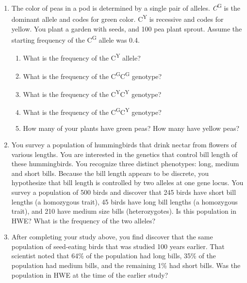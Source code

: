 \documentclass[11pt]{article}
\begin{document}
\begin{enumerate}

\item The color of peas in a pod is determined by a single pair of alleles.  \emph{C}\textsuperscript{G} is the dominant allele and codes for green color.  C\textsuperscript{Y} is recessive and codes for yellow.  You plant a garden with seeds, and 100 pea plant sprout.  Assume the starting frequency of the C\textsuperscript{G} allele was 0.4.  

	\begin{enumerate}[label=\alph*.]
		\item What is the frequency of the C\textsuperscript{Y} allele?\vspace{1cm}

		\item What is the frequency of the C\textsuperscript{G}C\textsuperscript{G} genotype?\vspace{1cm}

		\item What is the frequency of the C\textsuperscript{Y}C\textsuperscript{Y} genotype?\vspace{1cm}

		\item What is the frequency of the C\textsuperscript{G}C\textsuperscript{Y} genotype?\vspace{1cm}

		\item How many of your plants have green peas?  How many have yellow peas?\vspace{0.25cm}
	\end{enumerate}

\newpage

\item You survey a population of hummingbirds that drink nectar from flowers of various lengths.  You are interested in the genetics that control bill length of these hummingbirds. You recognize three distinct phenotypes: long, medium and short bills.  Because the bill length appears to be discrete, you hypothesize that bill length is controlled by two alleles at one gene locus. You survey a population of 500 birds and discover that 245 birds have short bill lengths (a homozygous trait), 45 birds have long bill lengths (a homozygous trait), and 210 have medium size bills (heterozygotes).  Is this population in HWE?  What is the frequency of the two alleles?\vspace{3in}

\item After completing your study above, you find discover that the same population of seed-eating birds that was studied 100 years earlier.  That scientist noted that 64\% of the population had long bills, 35\% of the population had medium bills, and the remaining 1\% had short bills.  Was the population in HWE at the time of the earlier study?  


\end{enumerate}
\end{document}
